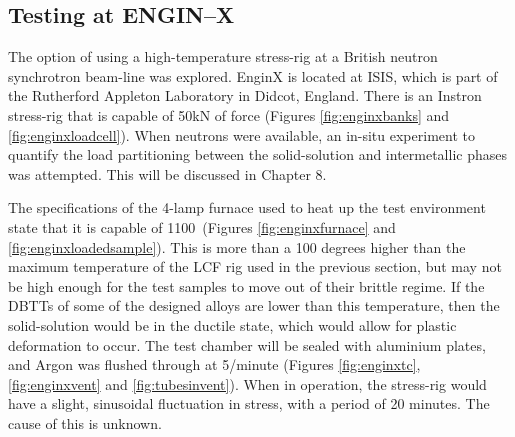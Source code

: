 \subsection{Testing at ENGIN--X}

The option of using a high-temperature stress-rig at a British neutron synchrotron beam-line was explored. EnginX is located at ISIS, which is part of the Rutherford Appleton Laboratory in Didcot, England.  There is an Instron stress-rig that is capable of 50kN of force (Figures \ref{fig:enginxbanks} and \ref{fig:enginxloadcell}).  When neutrons were available, an in-situ experiment to quantify the load partitioning between the solid-solution and intermetallic phases was attempted.  This will be discussed in Chapter 8.

The specifications of the 4-lamp furnace used to heat up the test environment state that it is capable of 1100\celsius\ (Figures \ref{fig:enginxfurnace} and \ref{fig:enginxloadedsample}).  This is more than a 100 degrees higher than the maximum temperature of the LCF rig used in the previous section, but may not be high enough for the test samples to move out of their brittle regime.  If the DBTTs of some of the designed alloys are lower than this temperature, then the solid-solution would be in the ductile state, which would allow for plastic deformation to occur.  The test chamber will be sealed with aluminium plates, and Argon was flushed through at 5\litre /minute (Figures \ref{fig:enginxtc}, \ref{fig:enginxvent} and \ref{fig:tubesinvent}).  When in operation, the stress-rig would have a slight, sinusoidal fluctuation in stress, with a period of 20 minutes.  The cause of this is unknown.

